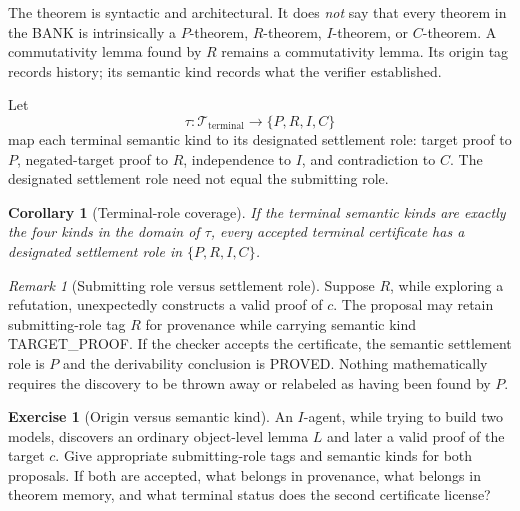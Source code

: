 \documentclass[11pt,openany]{book}
\newtheorem{corollary}[theorem]{Corollary}
\theoremstyle{definition}
\newtheorem{exercise}[theorem]{Exercise}
\theoremstyle{remark}
\newtheorem{remark}[theorem]{Remark}
\begin{document}
The theorem is syntactic and architectural. It does \emph{not} say that every theorem in the BANK is intrinsically a $P$-theorem, $R$-theorem, $I$-theorem, or $C$-theorem. A commutativity lemma found by $R$ remains a commutativity lemma. Its origin tag records history; its semantic kind records what the verifier established.

Let
\[
\tau:\mathcal T_{\mathrm{terminal}}\longrightarrow\{P,R,I,C\}
\]
map each terminal semantic kind to its designated settlement role: target proof to $P$, negated-target proof to $R$, independence to $I$, and contradiction to $C$. The designated settlement role need not equal the submitting role.

\begin{corollary}[Terminal-role coverage]\label{cor:terminalcoverage}
If the terminal semantic kinds are exactly the four kinds in the domain of $\tau$, every accepted terminal certificate has a designated settlement role in $\{P,R,I,C\}$.
\end{corollary}

\begin{remark}[Submitting role versus settlement role]
Suppose $R$, while exploring a refutation, unexpectedly constructs a valid proof of $c$. The proposal may retain submitting-role tag $R$ for provenance while carrying semantic kind \textsf{TARGET\_PROOF}. If the checker accepts the certificate, the semantic settlement role is $P$ and the derivability conclusion is \textsf{PROVED}. Nothing mathematically requires the discovery to be thrown away or relabeled as having been found by $P$.
\end{remark}

\begin{exercise}[Origin versus semantic kind]\label{ex:originkind}
An $I$-agent, while trying to build two models, discovers an ordinary object-level lemma $L$ and later a valid proof of the target $c$. Give appropriate submitting-role tags and semantic kinds for both proposals. If both are accepted, what belongs in provenance, what belongs in theorem memory, and what terminal status does the second certificate license?
\end{exercise}
\end{document}
